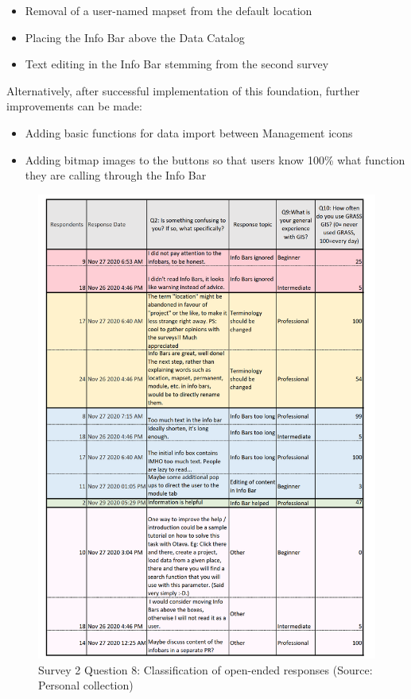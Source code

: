 \documentclass[a4paper,10pt,twoside]{article}
\begin{document}
\begin{itemize}
\item Removal of a user-named mapset from the default location
\item Placing the Info Bar above the Data Catalog
\item Text editing in the Info Bar stemming from the second survey
\end {itemize}

\noindent Alternatively, after successful implementation of this foundation, further improvements can be made:

\begin {itemize}
\item Adding basic functions for data import between Management icons
\item Adding bitmap images to the buttons so that users know 100\% what function they are calling through the Info Bar
\end {itemize}

\newpage
\begin{figure}[hbt!] 
\begin{center}
\includegraphics[width=15cm]{../surveys/analyzed_data/survey2_question8.png} 
\caption[Survey 2 Question 8: Classification of open-ended responses]{Survey 2 Question 8: Classification of open-ended responses (Source: Personal collection)}
\label{fig:survey2_question8}
\end{center}
\end{figure}
\end{document}
